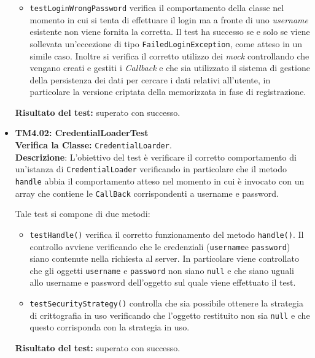 \begin{itemize}
\begin{itemize}
\item \texttt{testLoginWrongPassword} verifica il comportamento della classe nel momento in cui si tenta di effettuare il login ma a fronte di uno \textit{username} esistente non viene fornita la  corretta. Il test ha successo se e solo se viene sollevata un'eccezione di tipo \texttt{FailedLoginException}, come atteso in un simile caso. Inoltre si verifica il corretto utilizzo dei \textit{mock} controllando che vengano creati e gestiti i \textit{Callback} e che sia utilizzato il sistema di gestione della persistenza dei dati per cercare i dati relativi all'utente, in particolare la versione criptata della  memorizzata in fase di registrazione.
\end{itemize}

\textbf{Risultato del test:} superato con successo.


\item[\passed] \textbf{TM4.02: CredentialLoaderTest}\\
\textbf{Verifica la Classe:} \texttt{CredentialLoarder}.\\
\textbf{Descrizione}: L'obiettivo del test è verificare il corretto comportamento di un'istanza di \texttt{CredentialLoader} verificando in particolare che il metodo \texttt{handle} abbia il comportamento atteso nel momento in cui è invocato con un array che contiene le \texttt{CallBack} corrispondenti a username e password.

Tale test si compone di due metodi:
\begin{itemize}

\item \texttt{testHandle()} verifica il corretto funzionamento del metodo \texttt{handle()}. Il controllo avviene verificando che le credenziali (\texttt{username}e \texttt{password}) siano contenute nella richiesta al server. In particolare viene controllato che gli oggetti \texttt{username} e \texttt{password} non siano \texttt{null} e che siano uguali allo username e password dell'oggetto sul quale viene effettuato il test.

\item \texttt{testSecurityStrategy()} controlla che sia possibile ottenere la strategia di crittografia in uso verificando che l'oggetto restituito non sia \texttt{null} e che questo corrisponda con la strategia in uso.

\end{itemize}
\textbf{Risultato del test:} superato con successo.


\end{itemize}

